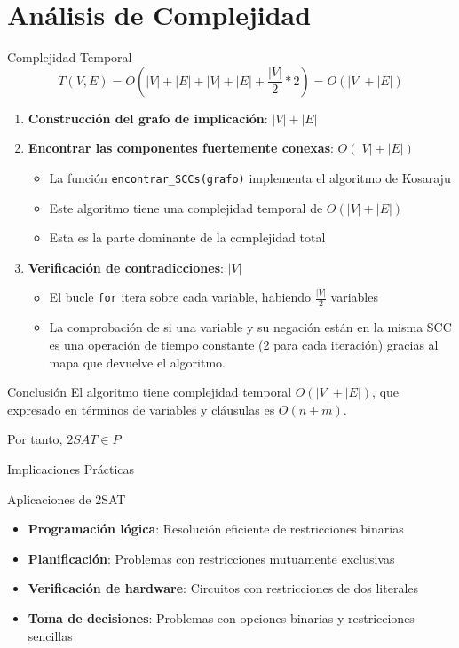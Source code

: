 \documentclass{beamer}
\begin{document}
\section{Análisis de Complejidad}
\begin{frame}{Complejidad Temporal}
\begin{equation*}
T(V, E) = O(|V| + |E| + |V| + |E| + \frac{|V|}{2} * 2) = O(|V| + |E|)
\end{equation*}

\begin{enumerate}
\item \textbf{Construcción del grafo de implicación}: $|V| + |E|$

\item \textbf{Encontrar las componentes fuertemente conexas}: $O(|V| + |E|)$
   \begin{itemize}
   \item La función \texttt{encontrar\_SCCs(grafo)} implementa el algoritmo de Kosaraju
   \item Este algoritmo tiene una complejidad temporal de $O(|V| + |E|)$
   \item \alert{Esta es la parte dominante de la complejidad total}
   \end{itemize}
   
\item \textbf{Verificación de contradicciones}: $|V|$
   \begin{itemize}
	\item El bucle \texttt{for} itera sobre cada variable, habiendo $\frac{|V|}{2}$ variables
	\item La comprobación de si una variable y su negación están en la misma SCC es una operación de tiempo constante (2 para cada iteración) gracias al mapa que devuelve el algoritmo.
   \end{itemize}
\end{enumerate}

\begin{block}{Conclusión}
El algoritmo tiene complejidad temporal $O(|V| + |E|)$, que expresado en términos de variables y cláusulas es $O(n + m)$.

Por tanto, \alert{$2SAT \in P$}
\end{block}
\end{frame}

\begin{frame}{Implicaciones Prácticas}
\begin{block}{Aplicaciones de 2SAT}
\begin{itemize}
\item \textbf{Programación lógica}: Resolución eficiente de restricciones binarias
\item \textbf{Planificación}: Problemas con restricciones mutuamente exclusivas
\item \textbf{Verificación de hardware}: Circuitos con restricciones de dos literales
\item \textbf{Toma de decisiones}: Problemas con opciones binarias y restricciones sencillas
\end{itemize}
\end{block}
\end{frame}
\end{document}
